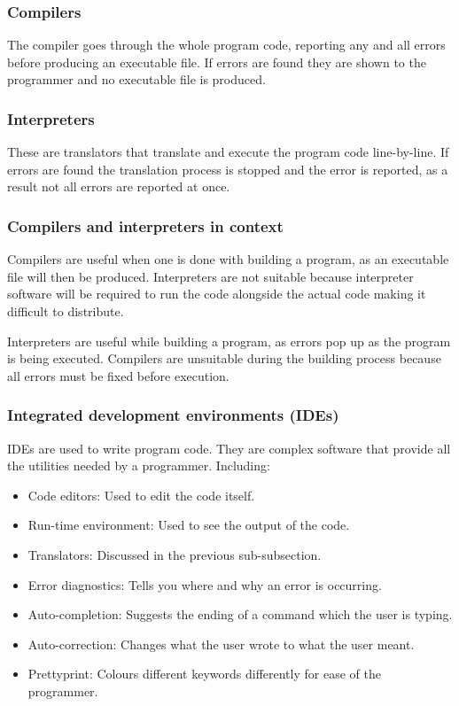 \documentclass{article}
\begin{document}
\subsubsection*{Compilers}
The compiler goes through the whole program code, reporting any and all errors before
producing an executable file. If errors are found they are shown to the programmer and
no executable file is produced. 

\subsubsection*{Interpreters}
These are translators that translate and execute the program code line-by-line. If errors
are found the translation process is stopped and the error is reported, as a result not
all errors are reported at once. 

\subsubsection{Compilers and interpreters in context}
Compilers are useful when one is done with building
a program, as an executable file will then be produced. Interpreters are not suitable
because interpreter software will be required to run the code alongside the actual code
making it difficult to distribute.

Interpreters are useful while building a program, as 
errors pop up as the program is being executed. Compilers are unsuitable during the 
building process because all errors must be fixed before execution.

\subsubsection{Integrated development environments (IDEs)}
IDEs are used to write program code. They are complex software that provide all the
utilities needed by a programmer. Including:
\begin{itemize}
	\item Code editors: Used to edit the code itself.
	\item Run-time environment: Used to see the output of the code.
	\item Translators: Discussed in the previous sub-subsection.
	\item Error diagnostics: Tells you where and why an error is occurring.
	\item Auto-completion: Suggests the ending of a command which the user is typing.
	\item Auto-correction: Changes what the user wrote to what the user meant.
	\item Prettyprint: Colours different keywords differently for ease of the programmer.
\end{itemize}
\end{document}
